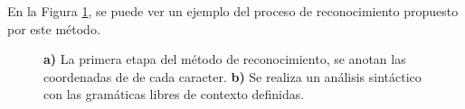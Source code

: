 En la Figura \ref{fig:gramaticas}, se puede ver un ejemplo del proceso de reconocimiento propuesto por este método.

\begin{figure}[h]
    \centering
    \caption{\textbf{a)} La primera etapa del método de reconocimiento, se anotan las coordenadas de de cada caracter. \textbf{b)} Se realiza un análisis sintáctico con las gramáticas libres de contexto definidas.}
    \label{fig:gramaticas}
\end{figure}


